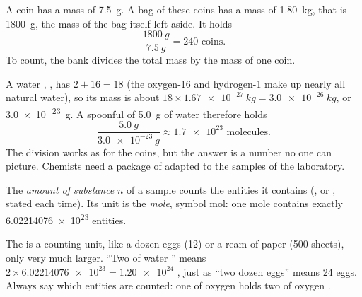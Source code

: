 \begin{example}\label{ex:g10:the-mole:coins}
A coin has a mass of \qty{7.5}{g}. A bag of these coins has a mass of
\qty{1.80}{kg}, that is \qty{1800}{g}, the mass of the bag itself left
aside. It holds
\[
  \frac{\qty{1800}{g}}{\qty{7.5}{g}} = 240 \text{ coins.}
\]
To count, the bank divides the total mass by the mass of one coin.
\end{example}

\begin{example}\label{ex:g10:the-mole:spoon}
A water , , has $2 + 16 = 18$  (the oxygen-16
and hydrogen-1  make up nearly all natural water), so its mass is
about $18 \times \qty{1.67e-27}{kg} = \qty{3.0e-26}{kg}$, or
\qty{3.0e-23}{g}. A spoonful of \qty{5.0}{g} of water therefore holds
\[
  \frac{\qty{5.0}{g}}{\qty{3.0e-23}{g}} \approx \num{1.7e23}
  \text{ molecules.}
\]
The division works as for the coins, but the answer is a number no one
can picture. Chemists need a package of  adapted to the samples of
the laboratory.
\end{example}

\begin{definition}\label{def:g10:the-mole:amount}
The \emph{amount of substance} $n$ of a sample
counts the entities it contains (,  or , stated each
time). Its unit is the \emph{mole}, symbol \si{mol}: one mole
contains exactly \num{6.02214076e23} entities.
\end{definition}

\begin{remark}\label{rem:g10:the-mole:dozen}
The  is a counting unit, like a dozen eggs (12) or a ream of paper
(500 sheets), only very much larger. ``Two  of water ''
means $2 \times \num{6.02214076e23} = \num{1.20e24}$ , just as
``two dozen eggs'' means 24 eggs. Always say which entities are counted:
one  of oxygen \emph{}  holds two  of oxygen
\emph{}.
\end{remark}

